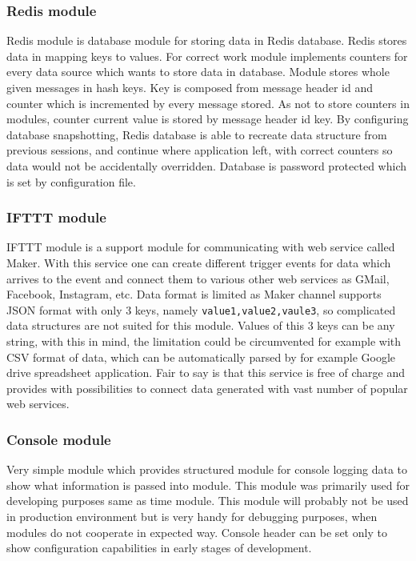\subsubsection{Redis module} %
\label{ssub:redis_module}
Redis module is database module for storing data in Redis database. Redis stores data in mapping keys to values. For correct work module implements counters for every data source which wants to store data in database. Module stores whole given messages in hash keys. Key is composed from message header id and counter which is incremented by every message stored. As not to store counters in modules, counter current value is stored by message header id key. By configuring database snapshotting, Redis database is able to recreate data structure from previous sessions, and continue where application left, with correct counters so data would not be accidentally overridden. Database is password protected which is set by configuration file.
\subsubsection{IFTTT module} %
\label{ssub:ifttt_module}
IFTTT module is a support module for communicating with web service called Maker. With this service one can create different trigger events for data which arrives to the event and connect them to various other web services as GMail, Facebook, Instagram, etc. Data format is limited as Maker channel supports JSON format with only 3 keys, namely \verb|value1,value2,vaule3|, so complicated data structures are not suited for this module. Values of this 3 keys can be any string, with this in mind, the limitation could be circumvented for example with CSV format of data, which can be automatically parsed by for example Google drive spreadsheet application. Fair to say is that this service is free of charge and provides with possibilities to connect data generated with vast number of popular web services.
\subsubsection{Console module} %
\label{ssub:console_module}
Very simple module which provides structured module for console logging data to show what information is passed into module. This module was primarily used for developing purposes same as time module. This module will probably not be used in production environment but is very handy for debugging purposes, when modules do not cooperate in expected way. Console header can be set only to show configuration capabilities in early stages of development.
